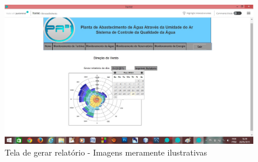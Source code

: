 \begin{center}
\begin{figure}[!ht]
\centering
\includegraphics[scale=0.4]{figuras/gerar_relatorio_por_data}
\caption[Tela de gerar relatório]{Tela de gerar relatório - Imagens meramente ilustrativas}
\label{gerar_relatorio}
\end{figure}

\clearpage

\end{center}
